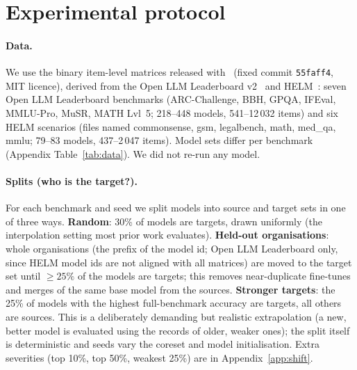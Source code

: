 \section{Experimental protocol}
\label{sec:protocol}
\paragraph{Data.}
We use the binary item-level matrices released with~\citet{zhang2025misses} (fixed commit \texttt{55faff4}, MIT licence), derived from the Open LLM Leaderboard v2~\citep{fourrier2024openllm} and HELM~\citep{liang2023helm}: seven Open LLM Leaderboard benchmarks (ARC-Challenge, BBH, GPQA, IFEval, MMLU-Pro, MuSR, MATH Lvl~5; 218--448 models, 541--12\,032 items) and six HELM scenarios (files named commonsense, gsm, legalbench, math, med\_qa, mmlu; 79--83 models, 437--2\,047 items). Model sets differ per benchmark (Appendix Table~\ref{tab:data}). We did not re-run any model.

\paragraph{Splits (who is the target?).}
For each benchmark and seed we split models into source and target sets in one of three ways. \textbf{Random}: 30\% of models are targets, drawn uniformly (the interpolation setting most prior work evaluates). \textbf{Held-out organisations}: whole organisations (the prefix of the model id; Open LLM Leaderboard only, since HELM model ids are not aligned with all matrices) are moved to the target set until $\ge25\%$ of the models are targets; this removes near-duplicate fine-tunes and merges of the same base model from the sources. \textbf{Stronger targets}: the 25\% of models with the highest full-benchmark accuracy are targets, all others are sources. This is a deliberately demanding but realistic extrapolation (a new, better model is evaluated using the records of older, weaker ones); the split itself is deterministic and seeds vary the coreset and model initialisation. Extra severities (top 10\%, top 50\%, weakest 25\%) are in Appendix~\ref{app:shift}.

